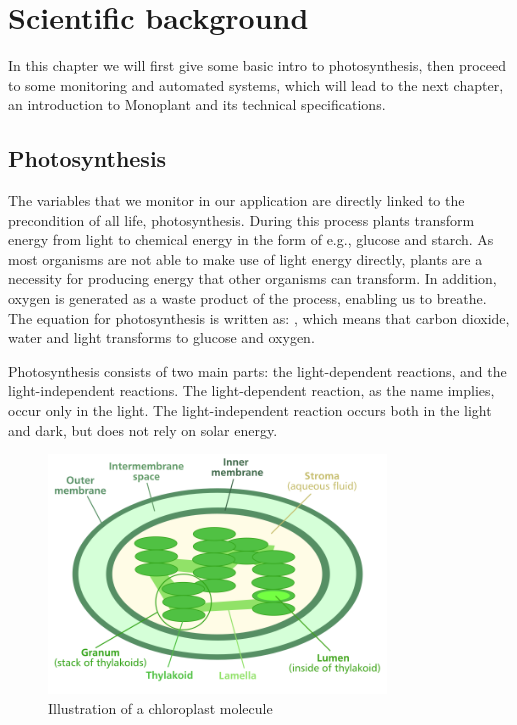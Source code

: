 \chapter{Scientific background}
In this chapter we will first give some basic intro to photosynthesis, then proceed to some monitoring and automated systems, which will lead to the next chapter, an introduction to Monoplant and its technical specifications.

\section{Photosynthesis}
The variables that we monitor in our application are directly linked to the precondition of all life, photosynthesis. During this process plants transform energy from light to chemical energy in the form of e.g., glucose and starch. As most organisms are not able to make use of light energy directly, plants are a necessity for producing energy that other organisms can transform. In addition, oxygen is generated as a waste product of the process, enabling us to breathe. The equation for photosynthesis is written as: , which means that carbon dioxide, water and light transforms to glucose and oxygen.  

Photosynthesis consists of two main parts: the light-dependent reactions, and the light-independent reactions. The light-dependent reaction, as the name implies, occur only in the light. The light-independent reaction occurs both in the light and dark, but does not rely on solar energy.  

\begin{figure}
\centering
\includegraphics[width=0.8\textwidth]{img/photosynthesis/Chloroplast_diagram.png}
\caption{Illustration of a chloroplast molecule \citep{wiki:chloroplast}}
\label{fig:chloroplast}
\end{figure}

